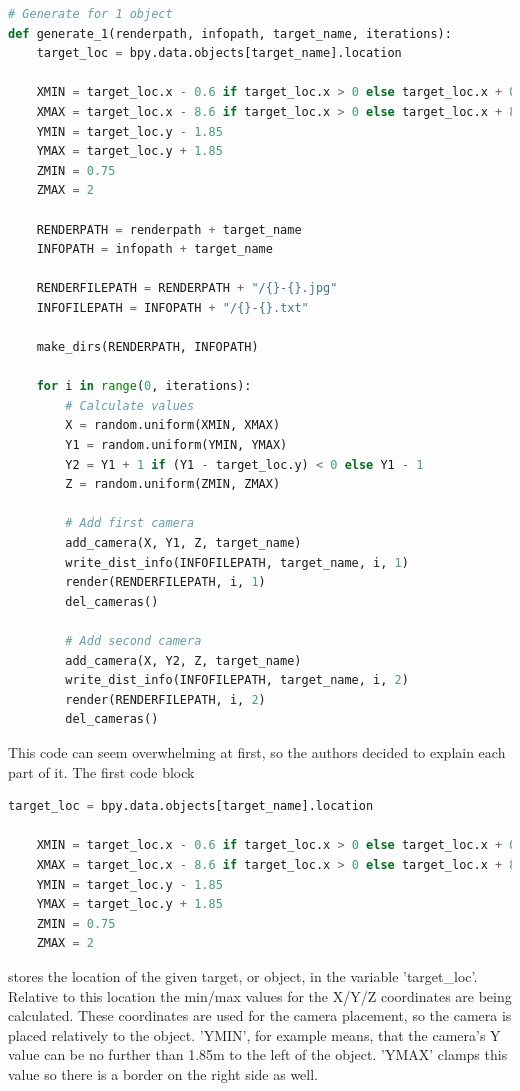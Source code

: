 \begin{lstlisting}[language=python]
# Generate for 1 object
def generate_1(renderpath, infopath, target_name, iterations):
    target_loc = bpy.data.objects[target_name].location

    XMIN = target_loc.x - 0.6 if target_loc.x > 0 else target_loc.x + 0.6
    XMAX = target_loc.x - 8.6 if target_loc.x > 0 else target_loc.x + 8.6
    YMIN = target_loc.y - 1.85
    YMAX = target_loc.y + 1.85
    ZMIN = 0.75
    ZMAX = 2
    
    RENDERPATH = renderpath + target_name
    INFOPATH = infopath + target_name

    RENDERFILEPATH = RENDERPATH + "/{}-{}.jpg"
    INFOFILEPATH = INFOPATH + "/{}-{}.txt"
    
    make_dirs(RENDERPATH, INFOPATH)
    
    for i in range(0, iterations):
        # Calculate values
        X = random.uniform(XMIN, XMAX)
        Y1 = random.uniform(YMIN, YMAX)
        Y2 = Y1 + 1 if (Y1 - target_loc.y) < 0 else Y1 - 1
        Z = random.uniform(ZMIN, ZMAX)
        
        # Add first camera
        add_camera(X, Y1, Z, target_name)
        write_dist_info(INFOFILEPATH, target_name, i, 1)
        render(RENDERFILEPATH, i, 1)
        del_cameras()
        
        # Add second camera
        add_camera(X, Y2, Z, target_name)
        write_dist_info(INFOFILEPATH, target_name, i, 2)
        render(RENDERFILEPATH, i, 2)
        del_cameras()
\end{lstlisting}

This code can seem overwhelming at first, so the authors decided to explain each part of it. The first code block

\begin{lstlisting}[language=python]
	target_loc = bpy.data.objects[target_name].location

    XMIN = target_loc.x - 0.6 if target_loc.x > 0 else target_loc.x + 0.6
    XMAX = target_loc.x - 8.6 if target_loc.x > 0 else target_loc.x + 8.6
    YMIN = target_loc.y - 1.85
    YMAX = target_loc.y + 1.85
    ZMIN = 0.75
    ZMAX = 2
\end{lstlisting}

stores the location of the given target, or object, in the variable 'target\_loc'. Relative to this location the min/max values for the X/Y/Z coordinates are being calculated. These coordinates are used for the camera placement, so the camera is placed relatively to the object. 'YMIN', for example means, that the camera's Y value can be no further than 1.85m to the left of the object. 'YMAX' clamps this value so there is a border on the right side as well.

